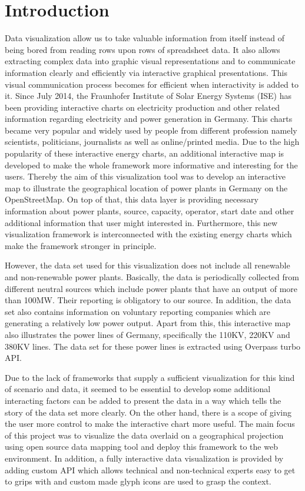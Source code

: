 \chapter{Introduction}

Data visualization allow us to take valuable information from itself instead of being bored from reading rows upon rows of spreadsheet data. It also allows extracting complex data into graphic visual representations and to communicate information clearly and efficiently via interactive graphical presentations. This visual communication process becomes for efficient when interactivity is added to it. Since July 2014, the Fraunhofer Institute of Solar Energy Systems (ISE) has been providing interactive charts on electricity production and other related information regarding electricity and power generation in Germany. This charts became very popular and widely used by people from different profession namely scientists, politicians, journalists as well as online/printed media. Due to the high popularity of these interactive energy charts, an additional interactive map is developed to make the whole framework more informative and interesting for the users. Thereby the aim of this visualization tool was to develop an interactive map to illustrate the geographical location of power plants in Germany on the OpenStreetMap. On top of that, this data layer is providing necessary information about power plants, source, capacity, operator, start date and other additional information that user might interested in. Furthermore, this new visualization framework is interconnected with the existing energy charts which make the framework stronger in principle.

However, the data set used for this visualization does not include all renewable and non-renewable power plants. Basically, the data is periodically collected from different neutral sources which include power plants that have an output of more than 100MW. Their reporting is obligatory to our source. In addition, the data set also contains information on voluntary reporting companies which are generating a relatively low power output. Apart from this, this interactive map also illustrates the power lines of Germany, specifically the 110KV, 220KV and 380KV lines. The data set for these power lines is extracted using Overpass turbo API. 

Due to the lack of frameworks that supply a sufficient visualization for this kind of scenario and data, it seemed to be essential to develop some additional interacting factors can be added to present the data in a way which tells the story of the data set more clearly. On the other hand, there is a scope of giving the user more control to make the interactive chart more useful. The main focus of this project was to visualize the data overlaid on a geographical projection using open source data mapping tool and deploy this framework to the web environment. In addition, a fully interactive data visualization is provided by adding custom API which allows technical and non-technical experts easy to get to grips with and custom made glyph icons are used to grasp the context.
 
